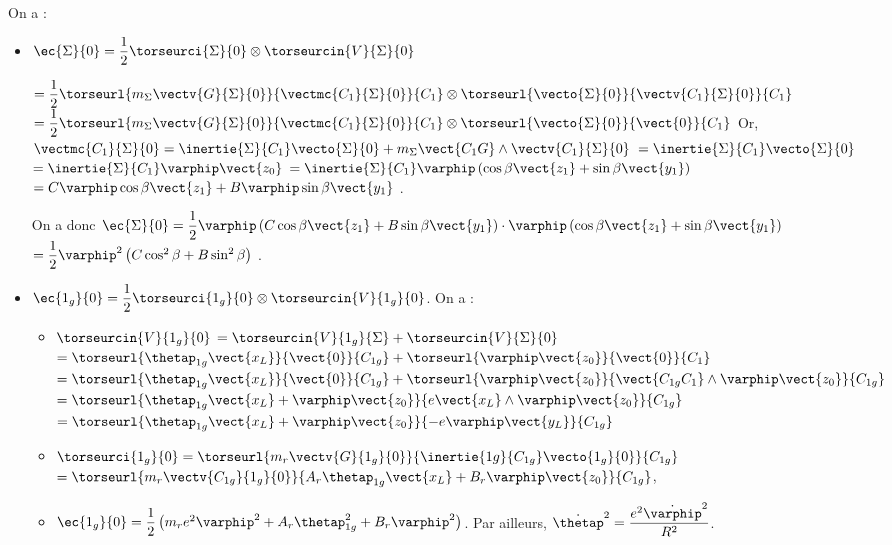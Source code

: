 \ifprof
\begin{corrige}
On a :
\begin{itemize}
\item $\ec{\Sigma}{0}=\dfrac{1}{2}\torseurci{\Sigma}{0}\otimes \torseurcin{V}{\Sigma}{0}$

$=\dfrac{1}{2}\torseurl{m_{\Sigma}\vectv{G}{\Sigma}{0}}{\vectmc{C_1}{\Sigma}{0}}{C_1}\otimes \torseurl{\vecto{\Sigma}{0}}{\vectv{C_1}{\Sigma}{0}}{C_1}$
$=\dfrac{1}{2}\torseurl{m_{\Sigma}\vectv{G}{\Sigma}{0}}{\vectmc{C_1}{\Sigma}{0}}{C_1}\otimes \torseurl{\vecto{\Sigma}{0}}{\vect{0}}{C_1}$
Or,  $\vectmc{C_1}{\Sigma}{0}=\inertie{\Sigma}{C_1}\vecto{\Sigma}{0} + m_{\Sigma} \vect{C_1 G}\wedge\vectv{C_1}{\Sigma}{0} $ $=\inertie{\Sigma}{C_1}\vecto{\Sigma}{0} $
 $=\inertie{\Sigma}{C_1}\varphip \vect{z_0} $ 
 $=\inertie{\Sigma}{C_1}\varphip \left( \cos\beta \vect{z_1}+\sin\beta \vect{y_1}\right) $
  $= C\varphip\cos\beta \vect{z_1}+B\varphip\sin\beta \vect{y_1} $ . 
 
On a donc $\ec{\Sigma}{0} = \dfrac{1}{2}\varphip \left(C\cos\beta \vect{z_1}+B\sin\beta \vect{y_1}\right) \cdot \varphip\left( \cos\beta \vect{z_1}+\sin\beta \vect{y_1}\right)$ 
$= \dfrac{1}{2}\varphip^2 \left(C\cos^2\beta +B\sin^2\beta\right)$ .
\item $\ec{1_g}{0}=\dfrac{1}{2}\torseurci{1_g}{0}\otimes \torseurcin{V}{1_g}{0}$. On a : 
\begin{itemize}
\item $\torseurcin{V}{1_g}{0}$ $=\torseurcin{V}{1_g}{\Sigma}+\torseurcin{V}{\Sigma}{0} $ 
$ = \torseurl{\thetap_{1g}\vect{x_L}}{\vect{0}}{C_{1g}} + \torseurl{\varphip\vect{z_0}}{\vect{0}}{C_{1}}$
$ = \torseurl{\thetap_{1g}\vect{x_L}}{\vect{0}}{C_{1g}}
 + \torseurl{\varphip\vect{z_0}}{\vect{C_{1g}C_1}\wedge \varphip\vect{z_0}}{C_{1g}}$
$ = \torseurl{\thetap_{1g}\vect{x_L}+\varphip\vect{z_0}}{e\vect{x_L}\wedge \varphip\vect{z_0}}{C_{1g}}$
$ = \torseurl{\thetap_{1g}\vect{x_L}+\varphip\vect{z_0}}{-e\varphip\vect{y_L}}{C_{1g}}$
\item $\torseurci{1_g}{0}=\torseurl{m_{r}\vectv{G}{1_g}{0}}{\inertie{1g}{C_{1g}}\vecto{1_g}{0}}{C_{1g}}$ 
$=\torseurl{m_{r}\vectv{C_{1g}}{1_g}{0}}{A_r \thetap_{1g} \vect{x_L}+ B_r \varphip\vect{z_0}  }{C_{1g}}$,
\item $\ec{1_g}{0}= \dfrac{1}{2} \left(m_re^2\varphip^2 + A_r \thetap_{1g}^2 + B_r \varphip^2\right)$. Par ailleurs, $\dot{\thetap}^2 = \dfrac{e^2 \dot{\varphip}^2}{R^2}$. 


\end{itemize}
\end{itemize}
\end{corrige}
